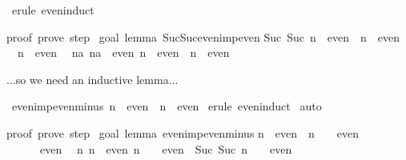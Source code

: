 \begin{isabellebody}
\ {\isacharparenleft}erule\ even{\isachardot}induct{\isacharparenright}\isanewline
{}%
\begin{isamarkuptext}%
proof\ {\isacharparenleft}prove{\isacharparenright}{\isacharcolon}\ step\ {}\isanewline
\isanewline
goal\ {\isacharparenleft}lemma\ Suc{\isacharunderscore}Suc{\isacharunderscore}even{\isacharunderscore}imp{\isacharunderscore}even{\isacharparenright}{\isacharcolon}\isanewline
Suc\ {\isacharparenleft}Suc\ n{\isacharparenright}\ {\isasymin}\ even\ {\isasymLongrightarrow}\ n\ {\isasymin}\ even\isanewline
\ {}{\isachardot}\ n\ {\isasymin}\ even\isanewline
\ {}{\isachardot}\ {\isasymAnd}na{\isachardot}\ {\isasymlbrakk}na\ {\isasymin}\ even{\isacharsemicolon}\ n\ {\isasymin}\ even{\isasymrbrakk}\ {\isasymLongrightarrow}\ n\ {\isasymin}\ even%
\end{isamarkuptext}%
%
\begin{isamarkuptext}%
...so we need an inductive lemma...%
\end{isamarkuptext}%
\ even{\isacharunderscore}imp{\isacharunderscore}even{\isacharunderscore}minus{\isacharunderscore}{}{\isacharcolon}\ {\isachardoublequote}n\ {\isasymin}\ even\ {\isasymLongrightarrow}\ n{\isacharminus}{\isacharhash}{}\ {\isasymin}\ even{\isachardoublequote}\isanewline
{}\ {\isacharparenleft}erule\ even{\isachardot}induct{\isacharparenright}\isanewline
{}\ auto\isanewline
{}%
\begin{isamarkuptext}%
proof\ {\isacharparenleft}prove{\isacharparenright}{\isacharcolon}\ step\ {}\isanewline
\isanewline
goal\ {\isacharparenleft}lemma\ even{\isacharunderscore}imp{\isacharunderscore}even{\isacharunderscore}minus{\isacharunderscore}{}{\isacharparenright}{\isacharcolon}\isanewline
n\ {\isasymin}\ even\ {\isasymLongrightarrow}\ n\ {\isacharminus}\ {\isacharhash}{}\ {\isasymin}\ even\isanewline
\ {}{\isachardot}\ {}\ {\isacharminus}\ {\isacharhash}{}\ {\isasymin}\ even\isanewline
\ {}{\isachardot}\ {\isasymAnd}n{\isachardot}\ {\isasymlbrakk}n\ {\isasymin}\ even{\isacharsemicolon}\ n\ {\isacharminus}\ {\isacharhash}{}\ {\isasymin}\ even{\isasymrbrakk}\ {\isasymLongrightarrow}\ Suc\ {\isacharparenleft}Suc\ n{\isacharparenright}\ {\isacharminus}\ {\isacharhash}{}\ {\isasymin}\ even%
\end{isamarkuptext}%
%
\begin{isamarkuptext}%

\end{isamarkuptext}
\end{isabellebody}
